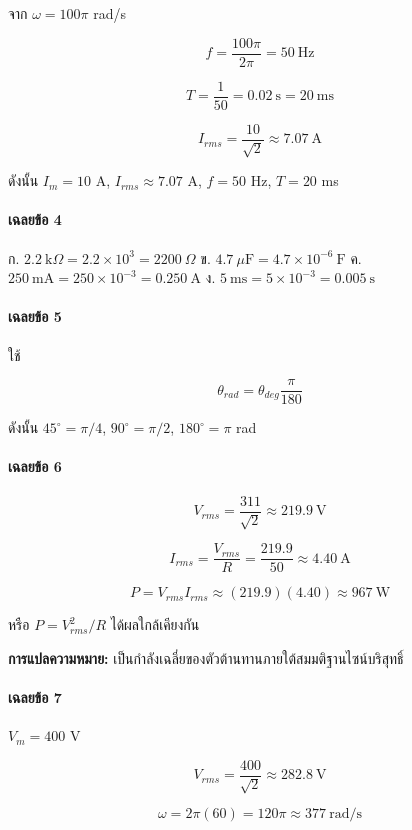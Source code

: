 จาก $\omega=100\pi$ rad/s

\[
f=\frac{100\pi}{2\pi}=50\ \mathrm{Hz}
\]

\[
T=\frac{1}{50}=0.02\ \mathrm{s}=20\ \mathrm{ms}
\]

\[
I_{rms}=\frac{10}{\sqrt{2}}\approx7.07\ \mathrm{A}
\]

ดังนั้น $I_m=10$ A, $I_{rms}\approx7.07$ A, $f=50$ Hz, $T=20$ ms

\paragraph{เฉลยข้อ 4}

ก. $2.2\ \mathrm{k}\Omega=2.2\times10^3=2200\ \Omega$
ข. $4.7\ \mu\mathrm{F}=4.7\times10^{-6}\ \mathrm{F}$
ค. $250\ \mathrm{mA}=250\times10^{-3}=0.250\ \mathrm{A}$
ง. $5\ \mathrm{ms}=5\times10^{-3}=0.005\ \mathrm{s}$

\paragraph{เฉลยข้อ 5}

ใช้

\[
\theta_{rad}=\theta_{deg}\frac{\pi}{180}
\]

ดังนั้น $45^\circ=\pi/4$, $90^\circ=\pi/2$, $180^\circ=\pi$ rad

\paragraph{เฉลยข้อ 6}

\[
V_{rms}=\frac{311}{\sqrt{2}}\approx219.9\ \mathrm{V}
\]

\[
I_{rms}=\frac{V_{rms}}{R}=\frac{219.9}{50}\approx4.40\ \mathrm{A}
\]

\[
P=V_{rms}I_{rms}\approx(219.9)(4.40)\approx967\ \mathrm{W}
\]

หรือ $P=V_{rms}^2/R$ ได้ผลใกล้เคียงกัน

\textbf{การแปลความหมาย:} เป็นกำลังเฉลี่ยของตัวต้านทานภายใต้สมมติฐานไซน์บริสุทธิ์

\paragraph{เฉลยข้อ 7}

$V_m=400$ V

\[
V_{rms}=\frac{400}{\sqrt{2}}\approx282.8\ \mathrm{V}
\]

\[
\omega=2\pi(60)=120\pi\approx377\ \mathrm{rad/s}
\]

